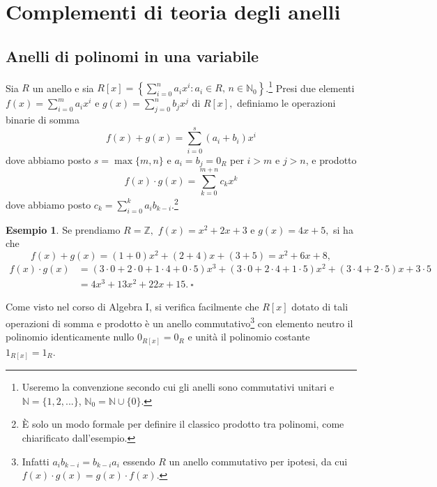 \documentclass{article}
\theoremstyle{definition}
\newtheorem*{exm}{Esempio}
\begin{document}
\section{Complementi di teoria degli anelli}
\vspace{1.75mm}
\subsection{Anelli di polinomi in una variabile}

Sia $R$ un anello e sia $R[x]=\left\{\sum\limits_{i=0}^n a_i x^i : a_i\in R,\, n\in \mathbb{N}_0\right\}$.\footnote{Useremo la convenzione secondo cui gli anelli sono commutativi unitari e $\mathbb{N}=\{1,2,...\}$, $\mathbb{N}_0=\mathbb{N}\cup \{0\}$.} Presi due elementi $f(x)=\sum\limits_{i=0}^m a_i x^i$ e $g(x)=\sum\limits_{j=0}^n b_j x^j$ di $R[x],$ definiamo le operazioni binarie di somma {\setlength{\belowdisplayskip}{4.5pt} \setlength{\abovedisplayskip}{-3.5pt} \[ f(x)+g(x)=\sum\limits_{i=0}^s (a_i+b_i)x^i \] dove abbiamo posto $s=\max\{m,n\}$ e $a_i=b_j=0_R$ per $i>m$ e $j>n$, e prodotto} {\setlength{\belowdisplayskip}{-3.5pt} \setlength{\abovedisplayskip}{3pt} \[ f(x)\cdot g(x)=\sum\limits_{k=0}^{m+n}c_k x^k\] dove abbiamo posto $c_k=\sum\limits_{i=0}^{k}a_i b_{k-i}$.\footnote{È solo un modo formale per definire il classico prodotto tra polinomi, come chiarificato dall'esempio.}}

\begin{exm}Se prendiamo $R=\mathbb{Z},$ $f(x)=x^2+2x+3$ e $g(x)=4x+5,$ si ha che \[ f(x)+g(x)=(1+0)x^2+(2+4)x+(3+5)=x^2+6x+8, \] {\setlength{\belowdisplayskip}{-2pt}\setlength{\abovedisplayskip}{0pt}\begin{align*}f(x)\cdot g(x) &= (3\cdot 0+2\cdot 0+1\cdot 4+0\cdot 5)x^3+(3\cdot 0+2\cdot 4+1\cdot 5)x^2+(3\cdot 4+2\cdot 5)x+3\cdot 5 \\ &= 4x^3+13x^2+22x+15. \ \square\end{align*}}\end{exm}

\noindent Come visto nel corso di Algebra I, si verifica facilmente che $R[x]$ dotato di tali operazioni di somma e prodotto è un anello commutativo\footnote{Infatti $a_ib_{k-i}=b_{k-i}a_i$ essendo $R$ un anello commutativo per ipotesi, da cui $f(x)\cdot g(x)=g(x)\cdot f(x)$.} con elemento neutro il polinomio identicamente nullo $0_{R[x]}=0_{R}$ e unità il polinomio costante $1_{R[x]}=1_{R}$. 

\vspace{1.5mm}
\end{document}
